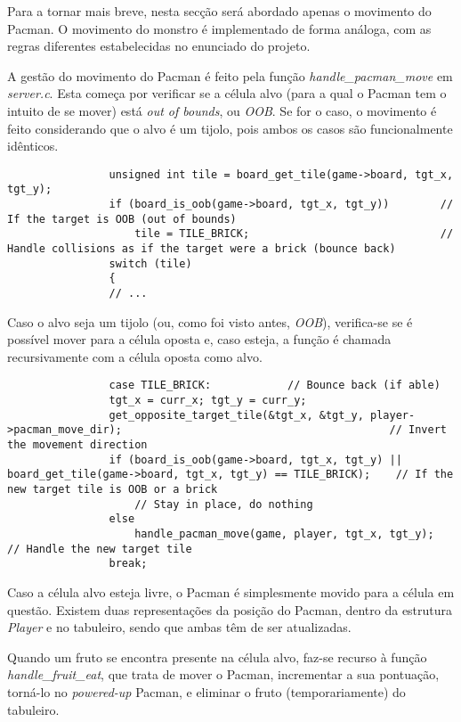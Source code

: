 \documentclass[a4paper]{report}
\begin{document}
            \par Para a tornar mais breve, nesta secção será abordado apenas o movimento do Pacman. O movimento do monstro é implementado de forma análoga, com as regras diferentes estabelecidas no enunciado do projeto.
            \par A gestão do movimento do Pacman é feito pela função \textit{handle\_pacman\_move} em \textit{server.c}. Esta começa por verificar se a célula alvo (para a qual o Pacman tem o intuito de se mover) está \textit{out of bounds}, ou \textit{OOB}. Se for o caso, o movimento é feito considerando que o alvo é um tijolo, pois ambos os casos são funcionalmente idênticos.
            \begin{lstlisting}
                unsigned int tile = board_get_tile(game->board, tgt_x, tgt_y);
                if (board_is_oob(game->board, tgt_x, tgt_y))        // If the target is OOB (out of bounds)
                    tile = TILE_BRICK;                              // Handle collisions as if the target were a brick (bounce back)
                switch (tile)
                {
                // ...
            \end{lstlisting}
            \par Caso o alvo seja um tijolo (ou, como foi visto antes, \textit{OOB}), verifica-se se é possível mover para a célula oposta e, caso esteja, a função é chamada recursivamente com a célula oposta como alvo.
            \begin{lstlisting}
                case TILE_BRICK:            // Bounce back (if able)
                tgt_x = curr_x; tgt_y = curr_y;
                get_opposite_target_tile(&tgt_x, &tgt_y, player->pacman_move_dir);                                          // Invert the movement direction
                if (board_is_oob(game->board, tgt_x, tgt_y) || board_get_tile(game->board, tgt_x, tgt_y) == TILE_BRICK);    // If the new target tile is OOB or a brick
                    // Stay in place, do nothing
                else
                    handle_pacman_move(game, player, tgt_x, tgt_y);                                                         // Handle the new target tile
                break;
            \end{lstlisting}
            \par Caso a célula alvo esteja livre, o Pacman é simplesmente movido para a célula em questão. Existem duas representações da posição do Pacman, dentro da estrutura \textit{Player} e no tabuleiro, sendo que ambas têm de ser atualizadas.
            \par Quando um fruto se encontra presente na célula alvo, faz-se recurso à função \textit{handle\_fruit\_eat}, que trata de mover o Pacman, incrementar a sua pontuação, torná-lo no \textit{powered-up} Pacman, e eliminar o fruto (temporariamente) do tabuleiro.
\end{document}
